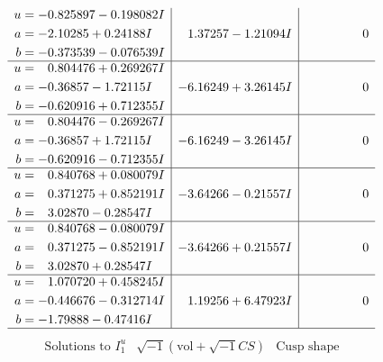 \documentclass[1p]{elsarticle_modified}
\theoremstyle{definition}
\newcommand{\I}{\sqrt{-1}}
\begin{document}
$$\begin{array}{c|c|c}
\begin{aligned}
u &= -0.825897 - 0.198082 I \\
a &= -2.10285 + 0.24188 I \\
b &= -0.373539 - 0.076539 I\end{aligned}
 & \phantom{-}1.37257 - 1.21094 I & \phantom{-0.000000 } 0 \\ \hline\begin{aligned}
u &= \phantom{-}0.804476 + 0.269267 I \\
a &= -0.36857 - 1.72115 I \\
b &= -0.620916 + 0.712355 I\end{aligned}
 & -6.16249 + 3.26145 I & \phantom{-0.000000 } 0 \\ \hline\begin{aligned}
u &= \phantom{-}0.804476 - 0.269267 I \\
a &= -0.36857 + 1.72115 I \\
b &= -0.620916 - 0.712355 I\end{aligned}
 & -6.16249 - 3.26145 I & \phantom{-0.000000 } 0 \\ \hline\begin{aligned}
u &= \phantom{-}0.840768 + 0.080079 I \\
a &= \phantom{-}0.371275 + 0.852191 I \\
b &= \phantom{-}3.02870 - 0.28547 I\end{aligned}
 & -3.64266 - 0.21557 I & \phantom{-0.000000 } 0 \\ \hline\begin{aligned}
u &= \phantom{-}0.840768 - 0.080079 I \\
a &= \phantom{-}0.371275 - 0.852191 I \\
b &= \phantom{-}3.02870 + 0.28547 I\end{aligned}
 & -3.64266 + 0.21557 I & \phantom{-0.000000 } 0 \\ \hline\begin{aligned}
u &= \phantom{-}1.070720 + 0.458245 I \\
a &= -0.446676 - 0.312714 I \\
b &= -1.79888 - 0.47416 I\end{aligned}
 & \phantom{-}1.19256 + 6.47923 I & \phantom{-0.000000 } 0\\
 \hline 
 \end{array}$$\newpage$$\begin{array}{c|c|c}  
\text{Solutions to }I^u_{1}& \I (\text{vol} + \sqrt{-1}CS) & \text{Cusp shape}\\
 \hline 
\begin{aligned}

\end{aligned}
\end{array}$$
\end{document}
